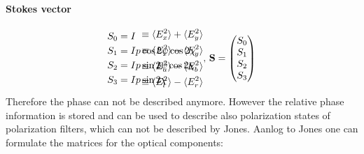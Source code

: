 \paragraph{Stokes vector}
\begin{align}
\begin{split}
S_0 &= I \\
S_1 &= I p \cos 2\psi \cos 2\chi \\
S_2 &= I p \sin 2\psi \cos 2\chi \\
S_3 &= I p \sin 2\chi
\end{split} \hspace{-6em}
\begin{split}
& \equiv \langle E_x^{2} \rangle + \langle E_y^{2} \rangle \\
& \equiv \langle E_x^{2} \rangle - \langle E_y^{2} \rangle \\
& \equiv \langle E_a^{2} \rangle - \langle E_b^{2} \rangle \\
& \equiv  \langle E_l^{2} \rangle - \langle E_r^{2} \rangle
\end{split}
, \,
\vec{S} =
\begin{pmatrix} S_0 \\ S_1 \\ S_2 \\ S_3\end{pmatrix}
\end{align}
% 
% 
Therefore the phase can not be described anymore.
However the relative phase information is stored and can be used to describe also polarization states of polarization filters, which can not be described by Jones.
Aanlog to Jones one can formulate the matrices for the optical components:
% 
